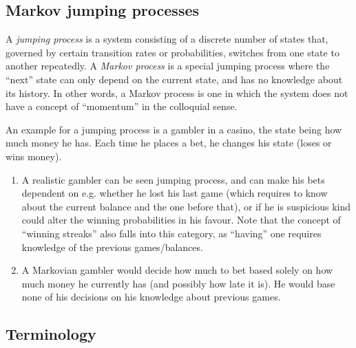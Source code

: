 \subsection{Markov jumping processes}
\label{sec:markov process}

A \emph{jumping process} is a system consisting of a discrete number of states that, governed by certain transition rates or probabilities, switches from one state to another repeatedly. A \emph{Markov process} is a special jumping process where the ``next'' state can only depend on the current state, and has no knowledge about its history. In other words, a Markov process is one in which the system does not have a concept of ``momentum'' in the colloquial sense.

An example for a jumping process is a gambler in a casino, the state being how much money he has. Each time he places a bet, he changes his state (loses or wins money).
%
\begin{enumerate}
	\item A realistic gambler can be seen jumping process, and can make his bets dependent on e.g. whether he lost his last game (which requires to know about the current balance and the one before that), or if he is suspicious kind could alter the winning probabilities in his favour. Note that the concept of ``winning streaks'' also falls into this category, as ``having'' one requires knowledge of the previous games/balances.
	\item A Markovian gambler would decide how much to bet based solely on how much money he currently has (and possibly how late it is). He would base none of his decisions on his knowledge about previous games.
\end{enumerate}






\subsection{Terminology}

